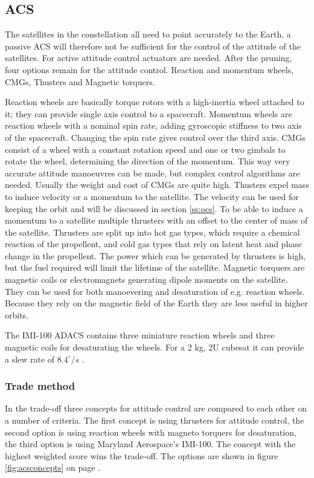 \subsection{\ac{ACS}}
\label{ss:acs}
The satellites in the constellation all need to point accurately to the Earth, a passive \ac{ACS} will therefore not be sufficient for the control of the attitude of the satellites. For active attitude control actuators are needed. After the pruning, four options remain for the attitude control. Reaction and momentum wheels, \acp{CMG}, Thusters and Magnetic torquers.

Reaction wheels are basically torque rotors with a high-inertia wheel attached to it; they can provide single axis control to a spacecraft. Momentum wheels are reaction wheels with a nominal spin rate, adding gyroscopic stiffness to two axis of the spacecraft. Changing the spin rate gives control over the third axis.
\acp{CMG} consist of a wheel with a constant rotation speed and one or two gimbals to rotate the wheel, determining the direction of the momentum. This way very accurate attitude manoeuvres can be made, but complex control algorithms are needed. Usually the weight and cost of \acp{CMG} are quite high.
Thusters expel mass to induce velocity or a momentum to the satellite. The velocity can be used for keeping the orbit and will be discussed in section \ref{ss:ocs}. To be able to induce a momentum to a satellite multiple thrusters with an offset to the center of mass of the satellite. Thrusters are split up into hot gas types, which require a chemical reaction of the propellent, and cold gas types that rely on latent heat and phase change in the propellent. The power which can be generated by thrusters is high, but the fuel required will limit the lifetime of the satellite.
Magnetic torquers are magnetic coils or electromagnets generating dipole moments on the satellite. They can be used for both manoevering and desaturation of e.g. reaction wheels. Because they rely on the magnetic field of the Earth they are less useful in higher orbits.

The IMI-100 ADACS contains three miniature reaction wheels and three magnetic coils for desaturating the wheels. For a 2 kg, 2U cubesat it can provide a slew rate of $8.4^\circ/s$ \cite{imi100}.

\subsubsection{Trade method}
In the trade-off three concepts for attitude control are compared to each other on a number of criteria. The first concept is using thrusters for attitude control, the second option is using reaction wheels with magneto torquers for desaturation, the third option is using Maryland Aerospace's IMI-100. The concept with the highest weighted score wins the trade-off. The options are shown in figure \ref{fig:acsconcepts} on page \pageref{fig:acsconcepts}.

